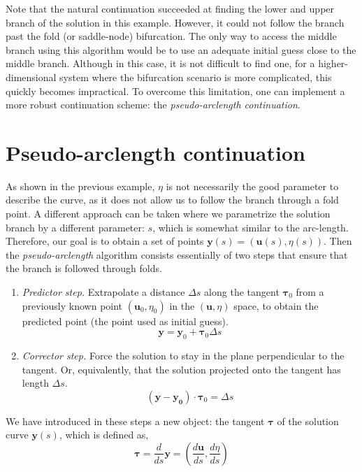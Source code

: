 Note that the natural continuation succeeded at finding the lower and upper branch of the solution
in this example.
However, it could not follow the branch past the fold (or saddle-node) bifurcation. The
only way to access the middle branch using this algorithm would be to use an adequate initial guess close
to the middle branch. 
Although in this case, it is not difficult to find one, for a higher-dimensional system where the
bifurcation scenario is more complicated, this quickly becomes impractical. To overcome this limitation,
one can implement a more robust continuation scheme: the {\em pseudo-arclength continuation}.

\section{Pseudo-arclength continuation}


As shown in the previous example, $\eta$ is not necessarily the good parameter to describe the curve, as it
does not allow us to follow the branch through a fold point. A different approach can be taken where we
parametrize the solution branch by a different parameter: $s$, which is somewhat similar
to the arc-length. Therefore, our goal is to obtain a set of points 
$\bm{y}(s) = (\bm{u}(s), \eta(s))$.
Then the {\em pseudo-arclength} algorithm \cite{keller1977numerical} consists essentially of two steps that ensure that the branch is followed through folds.
\begin{enumerate}
    \item {\em Predictor step.} Extrapolate a distance $\Delta s$ along the tangent $\bm{\tau}_0$ from a previously known point $(\bm{u}_0, \eta_0)$ in the $(\bm{u},\eta)$ space, to
    obtain the predicted point (the point used as initial guess). 
    $$\bm{y} = \bm{y}_0 + \bm{\tau}_0 \Delta s$$
    \item {\em Corrector step.} Force the solution to stay in the plane perpendicular to the tangent. 
    Or, equivalently, that the solution projected onto the tangent has length $\Delta s$. 
    $$(\bm{y} - \bm{y_0}) \cdot \bm{\tau}_0 = \Delta s$$
\end{enumerate}

We have introduced in these steps a new object: the tangent $\bm{\tau}$ of the solution curve $\bm{y}(s)$,
which is defined as,
\begin{equation}
    \bm{\tau} = \frac{d}{ds}\bm{y} = \left(\frac{d\bm{u}}{ds}, \frac{d\eta}{ds}\right)
\end{equation}

